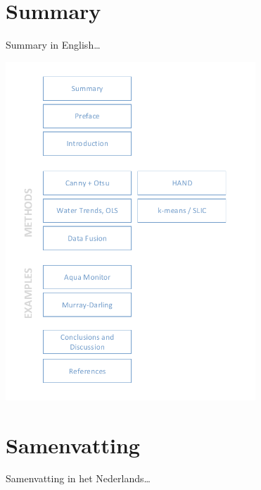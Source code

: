 \chapter*{Summary}

Summary in English\ldots

\begin{center}
	\includegraphics[height=5in]{00.2-summary/graphics/visual-map}
\end{center}

\chapter*{Samenvatting}

{

Samenvatting in het Nederlands\ldots

}

